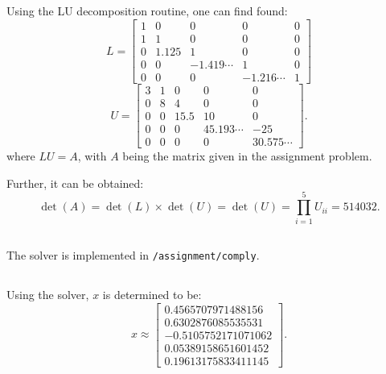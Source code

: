 \documentclass[12pt, a4paper]{article}
\begin{document}
  \subsection{}
  Using the LU decomposition routine, one can find found\footnotemark:
  \begin{equation}
    L = \begin{bmatrix}1 & 0 & 0 & 0 & 0 \\ 1 & 1 & 0 & 0 & 0 \\ 0 & 1.125 & 1 & 0 & 0 \\ 0 & 0 & -1.419\cdots & 1 & 0 \\ 0 & 0 & 0 & -1.216\cdots & 1\end{bmatrix}
  \end{equation}
  \begin{equation}
    U = \begin{bmatrix}3 & 1 & 0 & 0 & 0 \\ 0 & 8 & 4 & 0 & 0 \\ 0 & 0 & 15.5 & 10 & 0 \\ 0 & 0 & 0 & 45.193\cdots & -25 \\ 0 & 0 & 0 & 0 & 30.575\cdots\end{bmatrix}.
  \end{equation}
  where $LU = A$, with $A$ being the matrix given in the assignment problem.


  Further, it can be obtained:
  \begin{equation}
    \det(A) = \det(L) \times \det(U) = \det(U) = \prod_{i=1}^5 U_{ii} = 514032.
  \end{equation}

  \subsection{}
  The solver is implemented in \texttt{/assignment/comply}.

  \subsection{}
  Using the solver, $x$ is determined to be:
  \begin{equation}
    x \approx \begin{bmatrix}0.4565707971488156 \\ 0.6302876085535531 \\ -0.5105752171071062 \\ 0.05389158651601452 \\ 0.19613175833411145\end{bmatrix}.
  \end{equation}
\end{document}
